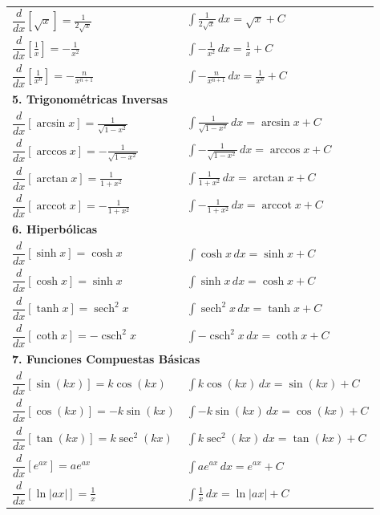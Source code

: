 \documentclass{article}
\DeclareMathOperator{\arccot}{arccot}
\begin{document}
\begin{center}
\begin{tabular}{p{}p{}}
$\dfrac{d}{dx}[\sqrt{x}] = \frac{1}{2\sqrt{x}}$ & $\displaystyle\int \frac{1}{2\sqrt{x}} \, dx = \sqrt{x} + C$ \\
$\dfrac{d}{dx}\left[\frac{1}{x}\right] = -\frac{1}{x^2}$ & $\displaystyle\int -\frac{1}{x^2} \, dx = \frac{1}{x} + C$ \\
$\dfrac{d}{dx}\left[\frac{1}{x^n}\right] = -\frac{n}{x^{n+1}}$ & $\displaystyle\int -\frac{n}{x^{n+1}} \, dx = \frac{1}{x^n} + C$ \\
\midrule
\multicolumn{2}{l}{\textbf{5. Trigonométricas Inversas}} \\
\midrule
$\dfrac{d}{dx}[\arcsin x] = \frac{1}{\sqrt{1-x^2}}$ & $\displaystyle\int \frac{1}{\sqrt{1-x^2}} \, dx = \arcsin x + C$ \\
$\dfrac{d}{dx}[\arccos x] = -\frac{1}{\sqrt{1-x^2}}$ & $\displaystyle\int -\frac{1}{\sqrt{1-x^2}} \, dx = \arccos x + C$ \\
$\dfrac{d}{dx}[\arctan x] = \frac{1}{1+x^2}$ & $\displaystyle\int \frac{1}{1+x^2} \, dx = \arctan x + C$ \\
$\dfrac{d}{dx}[\arccot x] = -\frac{1}{1+x^2}$ & $\displaystyle\int -\frac{1}{1+x^2} \, dx = \arccot x + C$ \\
\midrule
\multicolumn{2}{l}{\textbf{6. Hiperbólicas}} \\
\midrule
$\dfrac{d}{dx}[\sinh x] = \cosh x$ & $\displaystyle\int \cosh x \, dx = \sinh x + C$ \\
$\dfrac{d}{dx}[\cosh x] = \sinh x$ & $\displaystyle\int \sinh x \, dx = \cosh x + C$ \\
$\dfrac{d}{dx}[\tanh x] = \operatorname{sech}^2 x$ & $\displaystyle\int \operatorname{sech}^2 x \, dx = \tanh x + C$ \\
$\dfrac{d}{dx}[\coth x] = -\operatorname{csch}^2 x$ & $\displaystyle\int -\operatorname{csch}^2 x \, dx = \coth x + C$ \\
\midrule
\multicolumn{2}{l}{\textbf{7. Funciones Compuestas Básicas}} \\
\midrule
$\dfrac{d}{dx}[\sin(kx)] = k\cos(kx)$ & $\displaystyle\int k\cos(kx) \, dx = \sin(kx) + C$ \\
$\dfrac{d}{dx}[\cos(kx)] = -k\sin(kx)$ & $\displaystyle\int -k\sin(kx) \, dx = \cos(kx) + C$ \\
$\dfrac{d}{dx}[\tan(kx)] = k\sec^2(kx)$ & $\displaystyle\int k\sec^2(kx) \, dx = \tan(kx) + C$ \\
$\dfrac{d}{dx}[e^{ax}] = ae^{ax}$ & $\displaystyle\int ae^{ax} \, dx = e^{ax} + C$ \\
$\dfrac{d}{dx}[\ln|ax|] = \frac{1}{x}$ & $\displaystyle\int \frac{1}{x} \, dx = \ln|ax| + C$ \\
\bottomrule
\end{tabular}
\end{center}
\end{document}
